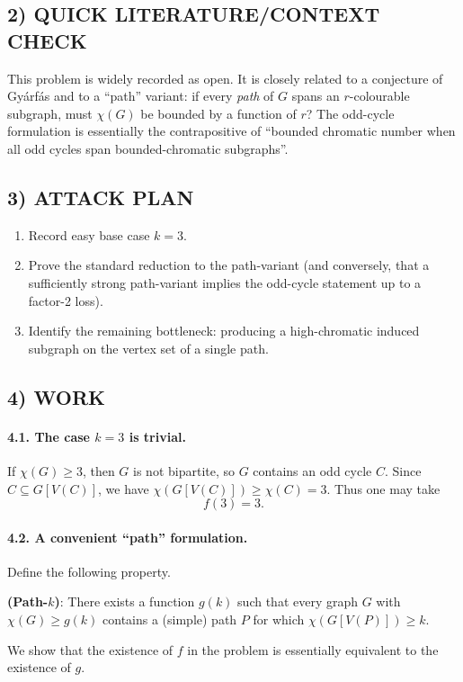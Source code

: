 \subsection*{2) QUICK LITERATURE/CONTEXT CHECK}
This problem is widely recorded as open.
It is closely related to a conjecture of Gy\'{a}rf\'{a}s and to a ``path'' variant: if every \emph{path} of $G$ spans an $r$-colourable subgraph, must $\chi(G)$ be bounded by a function of $r$?
The odd-cycle formulation is essentially the contrapositive of ``bounded chromatic number when all odd cycles span bounded-chromatic subgraphs''.

\subsection*{3) ATTACK PLAN}
\begin{enumerate}[label=\arabic*.]
\item Record easy base case $k=3$.
\item Prove the standard reduction to the path-variant (and conversely, that a sufficiently strong path-variant implies the odd-cycle statement up to a factor-2 loss).
\item Identify the remaining bottleneck: producing a high-chromatic induced subgraph on the vertex set of a single path.
\end{enumerate}

\subsection*{4) WORK}
\paragraph{4.1. The case $k=3$ is trivial.}
If $\chi(G)\ge 3$, then $G$ is not bipartite, so $G$ contains an odd cycle $C$.
Since $C\subseteq G[V(C)]$, we have $\chi(G[V(C)])\ge\chi(C)=3$.
Thus one may take
\[
  f(3)=3.
\]

\paragraph{4.2. A convenient ``path'' formulation.}
Define the following property.

\smallskip
\noindent\textbf{(Path-$k$)}: There exists a function $g(k)$ such that every graph $G$ with $\chi(G)\ge g(k)$ contains a (simple) path $P$ for which
$\chi(G[V(P)])\ge k$.

\smallskip
We show that the existence of $f$ in the problem is essentially equivalent to the existence of $g$.

